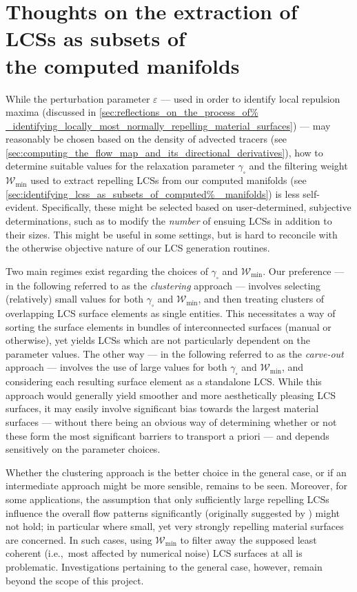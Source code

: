 \section[Thoughts on the extraction of LCSs as subsets of the computed manifolds]
{Thoughts on the extraction of LCSs as subsets of \\\phantom{5.5}
 the computed manifolds}
\label{sec:thoughts_on_the_extraction_of_lcss_as_subsets_of_the_computed%
_manifolds}

While the perturbation parameter $\varepsilon$ --- used in order to identify
local repulsion maxima (discussed in \cref{sec:reflections_on_the_process_of%
_identifying_locally_most_normally_repelling_material_surfaces}) --- may
reasonably be chosen based on the density of advected tracers (see
\cref{sec:computing_the_flow_map_and_its_directional_derivatives}), how to
determine suitable values for the relaxation parameter $\gamma_{\square}$ and
the filtering weight $\mathcal{W}_{\min}$ used to extract repelling LCSs from
our computed manifolds (see \cref{sec:identifying_lcss_as_subsets_of_computed%
_manifolds}) is less self-evident. Specifically, these might be selected based
on user-determined, subjective determinations, such as to modify the
\emph{number} of ensuing LCSs in addition to their sizes. This might be useful
in some settings, but is hard to reconcile with the otherwise objective nature
of our LCS generation routines.

Two main regimes exist regarding the choices of $\gamma_{\square}$ and
$\mathcal{W}_{\min}$. Our preference --- in the following referred to as the
\emph{clustering} approach --- involves selecting (relatively) small values for
both $\gamma_{\square}$ and $\mathcal{W}_{\min}$, and then treating clusters of
overlapping LCS surface elements as single entities. This necessitates a way of
sorting the surface elements in bundles of interconnected surfaces (manual or
otherwise), yet yields LCSs which are not particularly dependent on the
parameter values. The other way --- in the following referred to as the
\emph{carve-out} approach --- involves the use of large values for both
$\gamma_{\square}$ and $\mathcal{W}_{\min}$, and considering each resulting
surface element as a standalone LCS. While this approach would generally yield
smoother and more aesthetically pleasing LCS surfaces, it may easily involve
significant bias towards the largest material surfaces --- without there being
an obvious way of determining whether or not these form the most significant
barriers to transport a priori --- and depends sensitively on the parameter
choices.

Whether the clustering approach is the better choice in the general case, or if
an intermediate approach might be more sensible, remains to be seen. Moreover,
for some applications, the assumption that only sufficiently large repelling
LCSs influence the overall flow patterns significantly (originally suggested
by \textcite{farazmand2012computing}) might not hold; in particular where
small, yet very strongly repelling material surfaces are concerned. In such
cases, using $\mathcal{W}_{\min}$ to filter away the supposed least coherent
(i.e.,\ most affected by numerical noise) LCS surfaces at all is problematic.
Investigations pertaining to the general case, however, remain beyond the scope
of this project.
